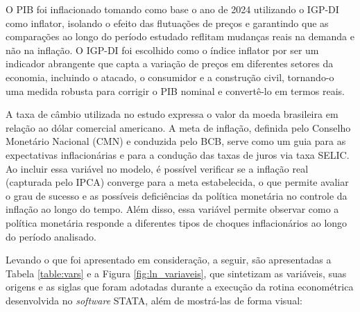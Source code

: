 \documentclass[12pt,oneside,a4paper,chapter=TITLE,english,brazil,sumario=abnt-6027-2012]{abntex2}
\begin{document}
O PIB foi inflacionado tomando como base o ano de 2024 utilizando o IGP-DI como inflator, isolando o efeito das flutuações de preços e garantindo que as comparações ao longo do período estudado reflitam mudanças reais na demanda e não na inflação. O IGP-DI foi escolhido como o índice inflator por ser um indicador abrangente que capta a variação de preços em diferentes setores da economia, incluindo o atacado, o consumidor e a construção civil, tornando-o uma medida robusta para corrigir o PIB nominal e convertê-lo em termos reais.

A taxa de câmbio utilizada no estudo expressa o valor da moeda brasileira em relação ao dólar comercial americano. A meta de inflação, definida pelo Conselho Monetário Nacional (CMN) e conduzida pelo BCB, serve como um guia para as expectativas inflacionárias e para a condução das taxas de juros via taxa SELIC. Ao incluir essa variável no modelo, é possível verificar se a inflação real (capturada pelo IPCA) converge para a meta estabelecida, o que permite avaliar o grau de sucesso e as possíveis deficiências da política monetária no controle da inflação ao longo do tempo. Além disso, essa variável permite observar como a política monetária responde a diferentes tipos de choques inflacionários ao longo do período analisado.

Levando o que foi apresentado em consideração, a seguir, são apresentadas a Tabela \ref{table:vars} e a Figura \ref{fig:ln_variaveis}, que sintetizam as variáveis, suas origens e as siglas que foram adotadas durante a execução da rotina econométrica desenvolvida no \textit{software} STATA, além de mostrá-las de forma visual:
\end{document}
